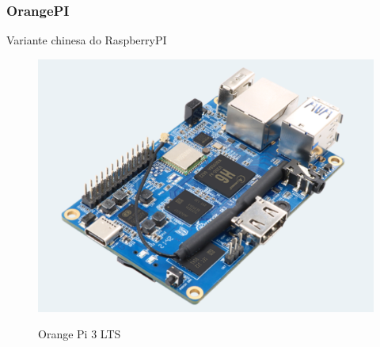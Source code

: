 \subsubsection{OrangePI}

Variante chinesa do RaspberryPI

\begin{figure}[!htbp]
  \caption{Orange Pi 3 LTS}
  \includegraphics[scale=0.4]{images/orange.png}
  \label{figura:orange}
\end{figure}

